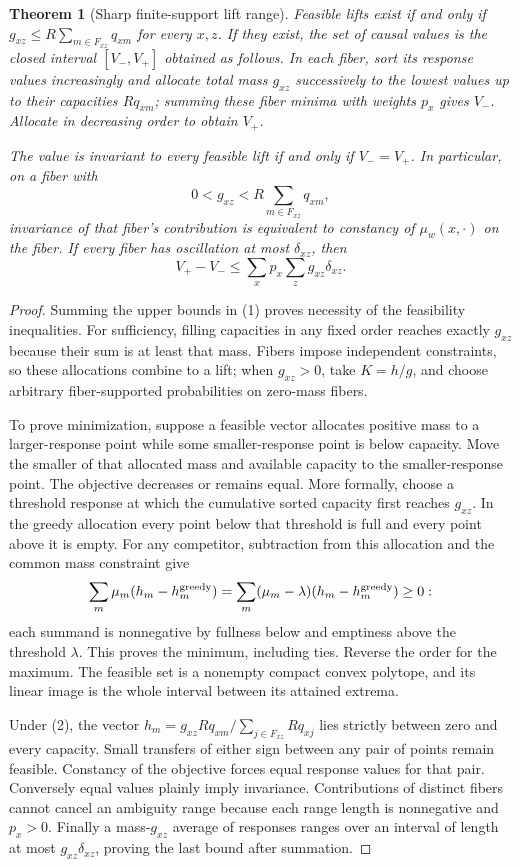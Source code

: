 \documentclass[11pt]{article}
\newtheorem{theorem}{Theorem}
\theoremstyle{remark}
\begin{document}
\begin{theorem}[Sharp finite-support lift range]\label{range}
Feasible lifts exist if and only if $g_{xz}\leq R\sum_{m\in F_{xz}}q_{xm}$ for every $x,z$. If they exist, the set of causal values is the closed interval $[V_-,V_+]$ obtained as follows. In each fiber, sort its response values increasingly and allocate total mass $g_{xz}$ successively to the lowest values up to their capacities $Rq_{xm}$; summing these fiber minima with weights $p_x$ gives $V_-$. Allocate in decreasing order to obtain $V_+$.

The value is invariant to every feasible lift if and only if $V_-=V_+$. In particular, on a fiber with
\[
 0<g_{xz}<R\sum_{m\in F_{xz}}q_{xm},\tag{2}
\]
invariance of that fiber's contribution is equivalent to constancy of $\mu_w(x,\cdot)$ on the fiber. If every fiber has oscillation at most $\delta_{xz}$, then
\[
            V_+-V_-\leq\sum_xp_x\sum_zg_{xz}\delta_{xz}.
\]
\end{theorem}
\begin{proof}
Summing the upper bounds in (1) proves necessity of the feasibility inequalities. For sufficiency, filling capacities in any fixed order reaches exactly $g_{xz}$ because their sum is at least that mass. Fibers impose independent constraints, so these allocations combine to a lift; when $g_{xz}>0$, take $K=h/g$, and choose arbitrary fiber-supported probabilities on zero-mass fibers.

To prove minimization, suppose a feasible vector allocates positive mass to a larger-response point while some smaller-response point is below capacity. Move the smaller of that allocated mass and available capacity to the smaller-response point. The objective decreases or remains equal. More formally, choose a threshold response at which the cumulative sorted capacity first reaches $g_{xz}$. In the greedy allocation every point below that threshold is full and every point above it is empty. For any competitor, subtraction from this allocation and the common mass constraint give
\[
 \sum_m\mu_m(h_m-h_m^{\rm greedy})
 =\sum_m(\mu_m-\lambda)(h_m-h_m^{\rm greedy})\geq0:
\]
each summand is nonnegative by fullness below and emptiness above the threshold $\lambda$. This proves the minimum, including ties. Reverse the order for the maximum. The feasible set is a nonempty compact convex polytope, and its linear image is the whole interval between its attained extrema.

Under (2), the vector
$h_m=g_{xz}Rq_{xm}/\sum_{j\in F_{xz}}Rq_{xj}$ lies strictly between zero and every capacity. Small transfers of either sign between any pair of points remain feasible. Constancy of the objective forces equal response values for that pair. Conversely equal values plainly imply invariance. Contributions of distinct fibers cannot cancel an ambiguity range because each range length is nonnegative and $p_x>0$. Finally a mass-$g_{xz}$ average of responses ranges over an interval of length at most $g_{xz}\delta_{xz}$, proving the last bound after summation.
\end{proof}
\end{document}
